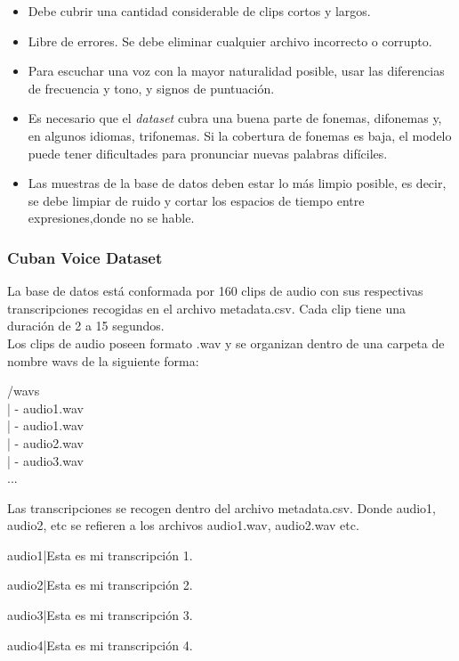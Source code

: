 \begin{itemize}
	\item Debe cubrir una cantidad considerable de clips cortos y largos.
	\item Libre de errores. Se debe eliminar cualquier archivo incorrecto o corrupto. 
	\item Para escuchar una voz con la mayor naturalidad posible, usar las diferencias de frecuencia y tono, y signos de puntuación.
	\item Es necesario que el \textit{dataset} cubra una buena parte de fonemas, difonemas y, en algunos idiomas, trifonemas. Si la cobertura de fonemas es baja, el modelo puede tener dificultades para pronunciar nuevas palabras difíciles.
	\item Las muestras de la base de datos deben estar lo más limpio posible, es decir, se debe limpiar de ruido y cortar los espacios de tiempo entre expresiones,donde no se hable.
	
\end{itemize}


\subsubsection{Cuban Voice Dataset}
La base de datos está conformada por 160 clips de audio con sus respectivas transcripciones recogidas en el archivo metadata.csv. Cada clip tiene una duración de 2 a 15 segundos.\\

Los clips de audio poseen formato .wav y se organizan dentro de una carpeta de nombre wavs de la siguiente forma:

\begin{center}
	/wavs\\
	| - audio1.wav\\
	| - audio1.wav\\
	| - audio2.wav\\
	| - audio3.wav\\
	...
\end{center}

Las transcripciones se recogen dentro del archivo metadata.csv. Donde audio1, audio2, etc se refieren a los archivos audio1.wav, audio2.wav etc.

\begin{center}
	audio1|Esta es mi transcripción 1.
	
	audio2|Esta es mi transcripción 2.
	
	audio3|Esta es mi transcripción 3.
	
	audio4|Esta es mi transcripción 4.
\end{center}

